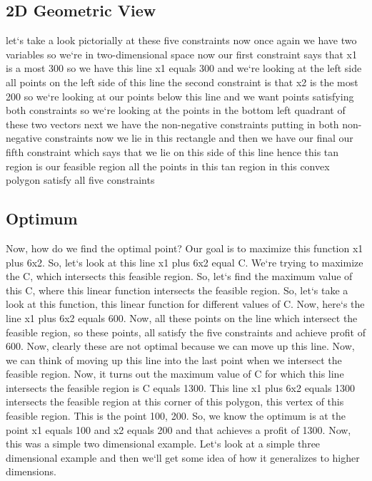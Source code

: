\subsection{2D Geometric View}
let`s take a look pictorially at these five constraints now once again we have two variables so we`re in two-dimensional space now our first constraint says that x1 is a most 300 so we have this line x1 equals 300 and we`re looking at the left side all points on the left side of this line the second constraint is that x2 is the most 200 so we`re looking at our points below this line and we want points satisfying both constraints so we`re looking at the points in the bottom left quadrant of these two vectors next we have the non-negative constraints putting in both non-negative constraints now we lie in this rectangle and then we have our final our fifth constraint which says that we lie on this side of this line hence this tan region is our feasible region all the points in this tan region in this convex polygon satisfy all five constraints

\subsection{Optimum}
Now, how do we find the optimal point? Our goal is to maximize this function x1 plus 6x2.
So, let`s look at this line x1 plus 6x2 equal C\@.
We`re trying to maximize the C, which intersects this feasible region.
So, let`s find the maximum value of this C, where this linear function intersects the feasible region.
So, let`s take a look at this function, this linear function for different values of C\@.
Now, here`s the line x1 plus 6x2 equals 600.
Now, all these points on the line which intersect the feasible region, so these points, all satisfy the five constraints and achieve profit of 600.
Now, clearly these are not optimal because we can move up this line.
Now, we can think of moving up this line into the last point when we intersect the feasible region.
Now, it turns out the maximum value of C for which this line intersects the feasible region is C equals 1300.
This line x1 plus 6x2 equals 1300 intersects the feasible region at this corner of this polygon, this vertex of this feasible region.
This is the point 100, 200.
So, we know the optimum is at the point x1 equals 100 and x2 equals 200 and that achieves a profit of 1300.
Now, this was a simple two dimensional example.
Let`s look at a simple three dimensional example and then we`ll get some idea of how it generalizes to higher dimensions.

